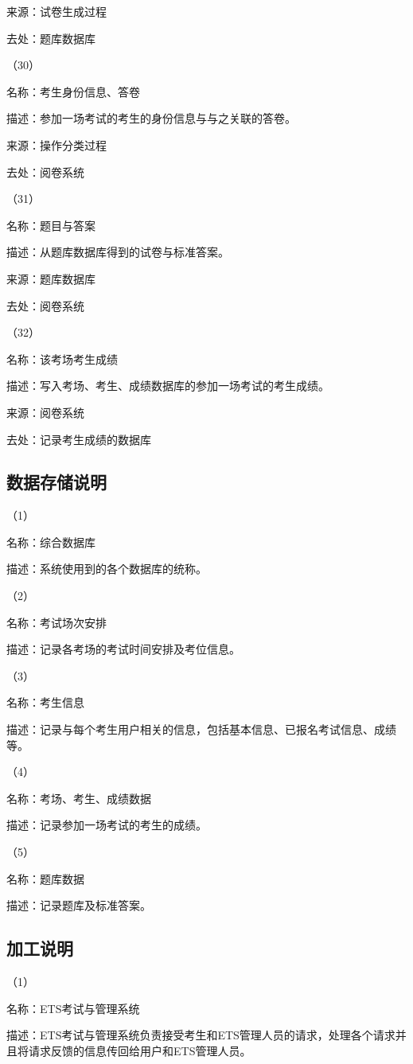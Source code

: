 来源：试卷生成过程

去处：题库数据库

（30）

名称：考生身份信息、答卷

描述：参加一场考试的考生的身份信息与与之关联的答卷。

来源：操作分类过程

去处：阅卷系统

（31）

名称：题目与答案

描述：从题库数据库得到的试卷与标准答案。

来源：题库数据库

去处：阅卷系统

（32）

名称：该考场考生成绩

描述：写入考场、考生、成绩数据库的参加一场考试的考生成绩。

来源：阅卷系统

去处：记录考生成绩的数据库

\subsection{数据存储说明}
（1）

名称：综合数据库

描述：系统使用到的各个数据库的统称。

（2）

名称：考试场次安排

描述：记录各考场的考试时间安排及考位信息。

（3）

名称：考生信息

描述：记录与每个考生用户相关的信息，包括基本信息、已报名考试信息、成绩等。

（4）

名称：考场、考生、成绩数据

描述：记录参加一场考试的考生的成绩。

（5）

名称：题库数据

描述：记录题库及标准答案。


\subsection{加工说明}
（1）

名称：ETS考试与管理系统

描述：ETS考试与管理系统负责接受考生和ETS管理人员的请求，处理各个请求并且将请求反馈的信息传回给用户和ETS管理人员。

